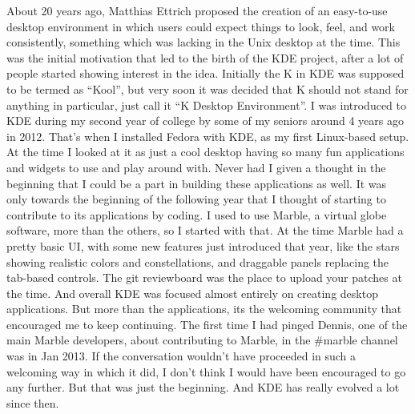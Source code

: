 


\noindent{}About 20 years ago, Matthias Ettrich proposed the creation of an easy-to-use desktop environment in which users could expect things to look, feel, and work consistently, something which was lacking in the Unix desktop at the time. This was the initial motivation that led to the birth of the KDE project, after a lot of people started showing interest in the idea. Initially the K in KDE was supposed to be termed as “Kool”, but very soon it was decided that K should not stand for anything in particular, just call it “K Desktop Environment”. I was introduced to KDE during my second year of college by some of my seniors around 4 years ago in 2012. That's when I installed Fedora with KDE, as my first Linux-based setup. At the time I looked at it as just a cool desktop having so many fun applications and widgets to use and play around with. Never had I given a thought in the beginning that I could be a part in building these applications as well. It was only towards the beginning of the following year that I thought of starting to contribute to its applications by coding. I used to use Marble, a virtual globe software, more than the others, so I started with that. At the time Marble had a pretty basic UI, with some new features just introduced that year, like the stars showing realistic colors and constellations, and draggable panels replacing the tab-based controls. The git reviewboard was the place to upload your patches at the time. And overall KDE was focused almost entirely on creating desktop applications. But more than the applications, its the welcoming community that encouraged me to keep continuing. The first time I had pinged Dennis, one of the main Marble developers, about contributing to Marble, in the \#marble channel was in Jan 2013. If the conversation wouldn't have proceeded in such a welcoming way in which it did, I don't think I would have been encouraged to go any further. But that was just the beginning. And KDE has really evolved a lot since then.


